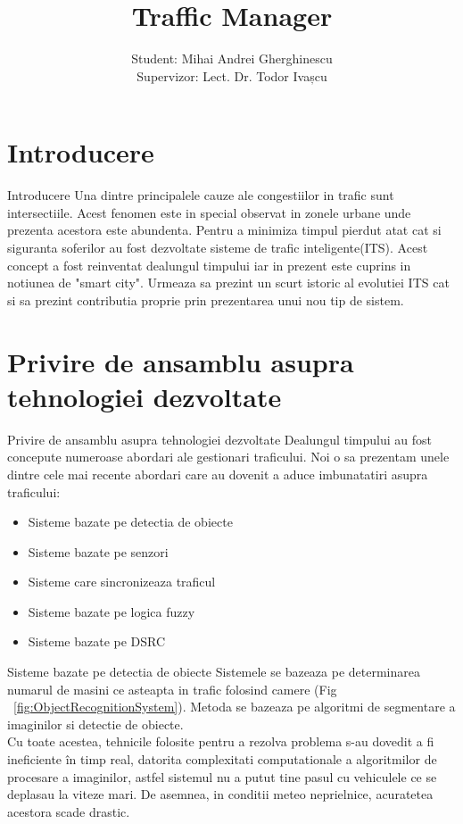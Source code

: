 \documentclass{beamer}
\title{Traffic Manager}
\author{Student: Mihai Andrei Gherghinescu \\ Supervizor: Lect. Dr. Todor Ivașcu}
\begin{document}
\frame{\titlepage}

\section{Introducere}
    \begin{frame}{Introducere}
        Una dintre principalele cauze ale congestiilor in trafic
        sunt intersectiile. Acest fenomen este in special observat in 
        zonele urbane unde prezenta acestora este abundenta. 
        Pentru a minimiza timpul pierdut atat cat si siguranta soferilor 
        au fost dezvoltate sisteme de trafic inteligente(ITS). Acest 
        concept a fost reinventat dealungul timpului iar in prezent 
        este cuprins in notiunea de "smart city". Urmeaza sa prezint un 
        scurt istoric al evolutiei ITS cat si sa 
        prezint contributia proprie prin prezentarea unui nou tip de sistem.
    \end{frame}

\section{Privire de ansamblu asupra tehnologiei dezvoltate}
    \begin{frame}{Privire de ansamblu asupra tehnologiei dezvoltate}
        Dealungul timpului au fost concepute numeroase abordari ale 
        gestionari traficului. Noi o sa prezentam unele dintre cele 
        mai recente abordari care au dovenit a aduce imbunatatiri asupra
        traficului:
        \begin{itemize}[<+-| alert@+>]
            \item Sisteme bazate pe detectia de obiecte 
            \item Sisteme bazate pe senzori
            \item Sisteme care sincronizeaza traficul
            \item Sisteme bazate pe logica fuzzy
            \item Sisteme bazate pe DSRC
            
        \end{itemize}
    \end{frame}

    \begin{frame}{Sisteme bazate pe detectia de obiecte }
        \indent
        Sistemele se bazeaza pe determinarea numarul de masini ce 
        asteapta in trafic folosind camere (Fig ~\ref{fig:ObjectRecognitionSystem}).
        Metoda se bazeaza pe algoritmi de segmentare a imaginilor si detectie de obiecte.\\
        Cu toate acestea, tehnicile folosite pentru a rezolva
        problema s-au dovedit a fi ineficiente în timp real, datorita 
        complexitati computationale a algoritmilor de procesare a 
        imaginilor, astfel sistemul nu a putut tine pasul cu vehiculele 
        ce se deplasau la viteze mari. De asemnea, in conditii meteo 
        neprielnice, acuratetea acestora scade drastic.
        
    \end{frame}
\end{document}
